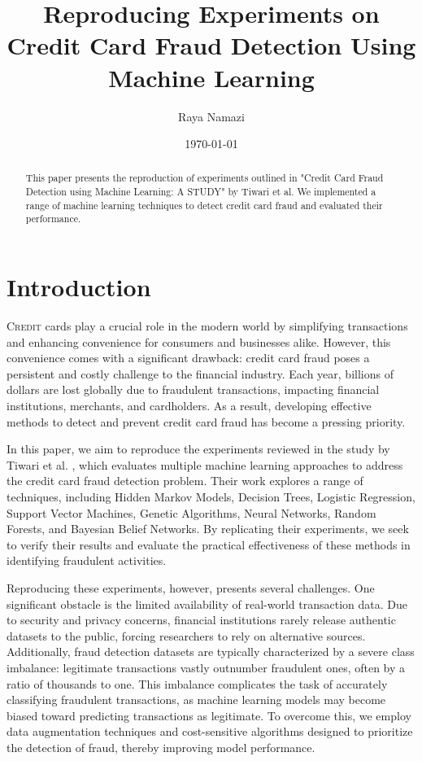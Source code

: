 \documentclass{article}
\title{Reproducing Experiments on Credit Card Fraud Detection Using Machine Learning}
\author{Raya Namazi}
\date{\today}
\begin{document}
\maketitle

\begin{abstract}
This paper presents the reproduction of experiments outlined in "Credit Card Fraud Detection using Machine Learning: A STUDY" by Tiwari et al\cite{tiwari2021credit}. We implemented a range of machine learning techniques to detect credit card fraud and evaluated their performance.
\end{abstract}

\section{Introduction}
\lettrine{C}{redit} cards play a crucial role in the modern world by simplifying transactions and enhancing convenience for consumers and businesses alike. However, this convenience comes with a significant drawback: credit card fraud poses a persistent and costly challenge to the financial industry. Each year, billions of dollars are lost globally due to fraudulent transactions, impacting financial institutions, merchants, and cardholders. As a result, developing effective methods to detect and prevent credit card fraud has become a pressing priority.

In this paper, we aim to reproduce the experiments reviewed in the study by Tiwari et al. \cite{tiwari2021credit}, which evaluates multiple machine learning approaches to address the credit card fraud detection problem. Their work explores a range of techniques, including Hidden Markov Models, Decision Trees, Logistic Regression, Support Vector Machines, Genetic Algorithms, Neural Networks, Random Forests, and Bayesian Belief Networks. By replicating their experiments, we seek to verify their results and evaluate the practical effectiveness of these methods in identifying fraudulent activities.

Reproducing these experiments, however, presents several challenges. One significant obstacle is the limited availability of real-world transaction data. Due to security and privacy concerns, financial institutions rarely release authentic datasets to the public, forcing researchers to rely on alternative sources. Additionally, fraud detection datasets are typically characterized by a severe class imbalance: legitimate transactions vastly outnumber fraudulent ones, often by a ratio of thousands to one. This imbalance complicates the task of accurately classifying fraudulent transactions, as machine learning models may become biased toward predicting transactions as legitimate. To overcome this, we employ data augmentation techniques and cost-sensitive algorithms designed to prioritize the detection of fraud, thereby improving model performance.
\end{document}
